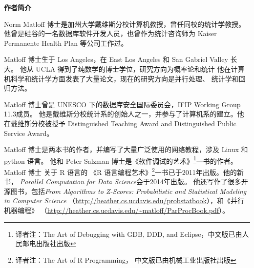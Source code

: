 \begin{center}
{\bf 作者简介}
\end{center}

Norm Matloff 博士是加州大学戴维斯分校计算机教授，曾任同校的统计学教授。
他曾是硅谷的一名数据库软件开发人员，也曾作为统计咨询师为 Kaiser Permanente Health Plan 等公司工作过。

Matloff 博士生于 Los Angeles，在 East Los Angeles 和 San Gabriel Valley 长大。
他从 UCLA 得到了纯数学的博士学位，研究方向为概率论和统计
他在计算机科学和统计学方面发表了大量论文，现在的研究方向是并行处理、
统计学和回归方法。


Matloff 博士曾是 UNESCO 下的数据库安全国际委员会，IFIP Working Group 11.3成员。
他是戴维斯分校统计系的创始人之一，并参与了计算机系的建立。他
在戴维斯分校被授予 Distinguished Teaching Award and Distinguished Public Service
Award。

Matloff 博士是两本书的作者，并编写了大量广泛使用的网络教程，涉及 Linux 和 python 语言。
他和 Peter Salzman 博士是《软件调试的艺术》\footnote{译者注：The Art of Debugging with GDB, DDD, and
Eclipse，中文版已由人民邮电出版社出版}一书的作者。Matloff 博士
关于 R 语言的 《R 语言编程艺术》\footnote{译者注：The Art of R Programming，
中文版已由机械工业出版社出版}一书已于2011年出版。他的新书， {\it Parallel
Computation for Data Science}会于2014年出版。
他还写作了很多开源图书，包括{\it From Algorithms
to Z-Scores: Probabilistic and Statistical Modeling in Computer Science}
（\url{http://heather.cs.ucdavis.edu/probstatbook}），和《并行机器编程》
（\url{http://heather.cs.ucdavis.edu/~matloff/ParProcBook.pdf}）。
